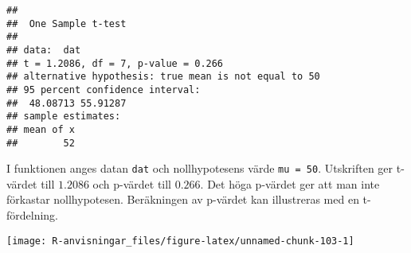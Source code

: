 \documentclass[
]{book}
\newenvironment{Shaded}{\begin{snugshade}}{\end{snugshade}}
\newcommand{\AttributeTok}[1]{\textcolor[rgb]{0.77,0.63,0.00}{#1}}
\newcommand{\DecValTok}[1]{\textcolor[rgb]{0.00,0.00,0.81}{#1}}
\newcommand{\FloatTok}[1]{\textcolor[rgb]{0.00,0.00,0.81}{#1}}
\newcommand{\FunctionTok}[1]{\textcolor[rgb]{0.00,0.00,0.00}{#1}}
\newcommand{\NormalTok}[1]{#1}
\newcommand{\OtherTok}[1]{\textcolor[rgb]{0.56,0.35,0.01}{#1}}
\newcommand{\SpecialCharTok}[1]{\textcolor[rgb]{0.00,0.00,0.00}{#1}}
\newcommand{\StringTok}[1]{\textcolor[rgb]{0.31,0.60,0.02}{#1}}
\theoremstyle{definition}
\theoremstyle{definition}
\theoremstyle{definition}
\theoremstyle{definition}
\theoremstyle{remark}
\begin{document}
\begin{verbatim}
## 
##  One Sample t-test
## 
## data:  dat
## t = 1.2086, df = 7, p-value = 0.266
## alternative hypothesis: true mean is not equal to 50
## 95 percent confidence interval:
##  48.08713 55.91287
## sample estimates:
## mean of x 
##        52
\end{verbatim}

I funktionen anges datan \texttt{dat} och nollhypotesens värde \texttt{mu\ =\ 50}. Utskriften ger t-värdet till \(1.2086\) och p-värdet till \(0.266\). Det höga p-värdet ger att man inte förkastar nollhypotesen. Beräkningen av p-värdet kan illustreras med en t-fördelning.

\begin{Shaded}
\end{Shaded}

\begin{center}\texttt{[image: R-anvisningar\_files/figure-latex/unnamed-chunk-103-1]} \end{center}
\end{document}
